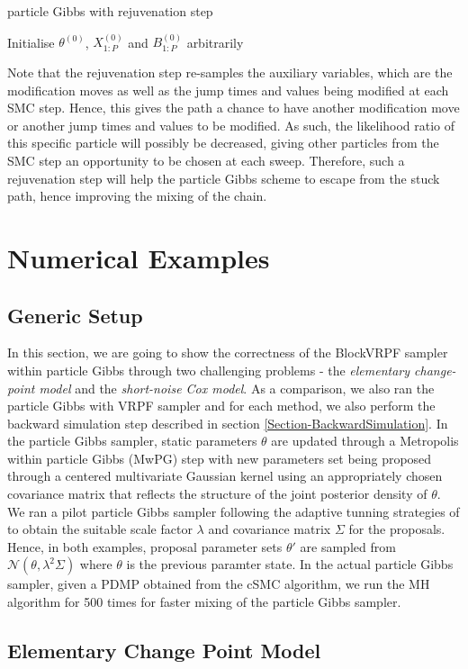 \documentclass[12pt,a4paper]{article}
\begin{document}
\begin{algorithm}[htb!]
    \caption{particle Gibbs with rejuvenation step}
            Initialise $\theta^{(0)}$, $X_{1:P}^{(0)}$ and $B_{1:P}^{(0)}$ arbitrarily\;
    \label{particle Gibbs-rejuvenation}
\end{algorithm}

Note that the rejuvenation step re-samples the auxiliary variables, which are the modification moves as well as the jump times and values being modified at each SMC step. Hence, this gives the path a chance to have another modification move or another jump times and values to be modified. As such, the likelihood ratio of this specific particle will possibly be decreased, giving other particles from the SMC step an opportunity to be chosen at each sweep. Therefore, such a rejuvenation step will help the particle Gibbs scheme to escape from the stuck path, hence improving the mixing of the chain. 
\section{Numerical Examples}
\subsection{Generic Setup}
In this section, we are going to show the correctness of the BlockVRPF sampler within particle Gibbs through two challenging problems - the \textit{elementary change-point model} and the \textit{short-noise Cox model}. As a comparison, we also ran the particle Gibbs with VRPF sampler and for each method, we also perform the backward simulation step described in section \ref{Section-BackwardSimulation}. In the particle Gibbs sampler, static parameters \(\theta\) are updated through a Metropolis within particle Gibbs (MwPG) step with new parameters set being proposed through a centered multivariate Gaussian kernel using an appropriately chosen covariance matrix that reflects the structure of the joint posterior density of \(\theta\). We ran a pilot particle Gibbs sampler following the adaptive tunning strategies of \cite{andrieu2008tutorial} to obtain the suitable scale factor $\lambda$ and covariance matrix \(\Sigma\) for the proposals. Hence, in both examples, proposal parameter sets \(\theta'\) are sampled from \(\mathcal{N}(\theta,\lambda^2\Sigma)\) where \(\theta\) is the previous paramter state. In the actual particle Gibbs sampler, given a PDMP obtained from the cSMC algorithm, we run the MH algorithm for 500 times for faster mixing of the particle Gibbs sampler. 
\subsection{Elementary Change Point Model}
\newpage


\end{document}
